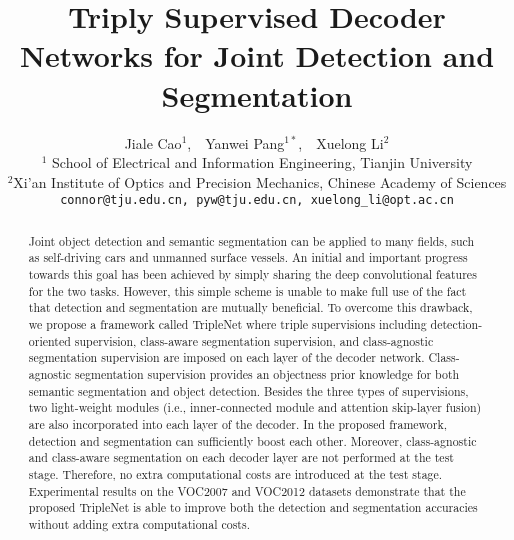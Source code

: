 \documentclass[10pt,twocolumn,letterpaper]{article}
\begin{document}
\title{Triply Supervised Decoder Networks for Joint Detection and Segmentation}


\author{Jiale Cao$^1$,~~Yanwei Pang$^{1*}$,~~Xuelong Li$^2$\\
$^1$ School of Electrical and Information Engineering, Tianjin University\\
$^2$Xi'an Institute of Optics and Precision Mechanics, Chinese Academy of Sciences\\
{\tt\small connor@tju.edu.cn, pyw@tju.edu.cn, xuelong\_li@opt.ac.cn}
}
\maketitle


\begin{abstract}
Joint object detection and semantic segmentation can be applied to many fields, such as self-driving cars and unmanned surface vessels. An initial and important progress towards this goal has been achieved by simply sharing the deep convolutional features for the two tasks. However, this simple scheme is unable to make full use of the fact that detection and segmentation are mutually beneficial. To overcome this drawback, we propose a framework called TripleNet where triple supervisions including detection-oriented supervision, class-aware segmentation supervision, and class-agnostic segmentation supervision are imposed on each layer of the decoder network. Class-agnostic segmentation supervision provides an objectness prior knowledge for both semantic segmentation and object detection.  Besides the three types of supervisions, two light-weight modules (i.e., inner-connected module and attention skip-layer fusion) are also incorporated into each layer of the decoder. In the proposed framework, detection and segmentation can sufficiently boost each other. Moreover, class-agnostic and class-aware segmentation on each decoder layer are not performed at the test stage. Therefore, no extra computational costs are introduced at the test stage. Experimental results on the VOC2007 and VOC2012 datasets demonstrate that the proposed TripleNet is able to improve both the detection and segmentation accuracies without adding extra computational costs. 
\end{abstract}
\end{document}
